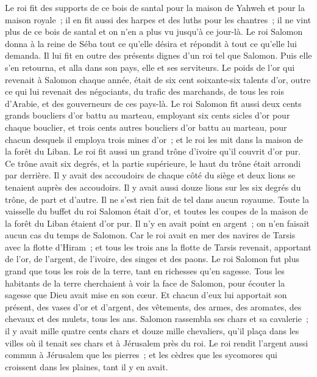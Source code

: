 \begin{multicols}{2}
Le roi fit des supports de ce bois de santal pour la maison de Yahweh et pour la maison royale~; il en fit aussi des harpes et des luths pour les chantres~; il ne vint plus de ce bois de santal et on n'en a plus vu jusqu'à ce jour-là.
Le roi Salomon donna à la reine de Séba tout ce qu'elle désira et répondit à tout ce qu'elle lui demanda. Il lui fit en outre des présents dignes d'un roi tel que Salomon. Puis elle s'en retourna, et alla dans son pays, elle et ses serviteurs.
Le poids de l'or qui revenait à Salomon chaque année, était de six cent soixante-six talents d'or,
outre ce qui lui revenait des négociants, du trafic des marchands, de tous les rois d'Arabie, et des gouverneurs de ces pays-là.
Le roi Salomon fit aussi deux cents grands boucliers d'or battu au marteau, employant six cents sicles d'or pour chaque bouclier,
et trois cents autres boucliers d'or battu au marteau, pour chacun desquels il employa trois mines d'or~; et le roi les mit dans la maison de la forêt du Liban.
Le roi fit aussi un grand trône d'ivoire qu'il couvrit d'or pur.
Ce trône avait six degrés, et la partie supérieure, le haut du trône était arrondi par derrière. Il y avait des accoudoirs de chaque côté du siège et deux lions se tenaient auprès des accoudoirs.
Il y avait aussi douze lions sur les six degrés du trône, de part et d'autre. Il ne s'est rien fait de tel dans aucun royaume.
Toute la vaisselle du buffet du roi Salomon était d'or, et toutes les coupes de la maison de la forêt du Liban étaient d'or pur. Il n'y en avait point en argent~; on n'en faisait aucun cas du temps de Salomon.
Car le roi avait en mer des navires de Tarsis avec la flotte d'Hiram~; et tous les trois ans la flotte de Tarsis revenait, apportant de l'or, de l'argent, de l'ivoire, des singes et des paons.
Le roi Salomon fut plus grand que tous les rois de la terre, tant en richesses qu'en sagesse.
Tous les habitants de la terre cherchaient à voir la face de Salomon, pour écouter la sagesse que Dieu avait mise en son cœur.
Et chacun d'eux lui apportait son présent, des vases d'or et d'argent, des vêtements, des armes, des aromates, des chevaux et des mulets, tous les ans.
Salomon rassembla ses chars et sa cavalerie~; il y avait mille quatre cents chars et douze mille chevaliers, qu'il plaça dans les villes où il tenait ses chars et à Jérusalem près du roi.
Le roi rendit l'argent aussi commun à Jérusalem que les pierres~; et les cèdres que les sycomores qui croissent dans les plaines, tant il y en avait.

\end{multicols}

